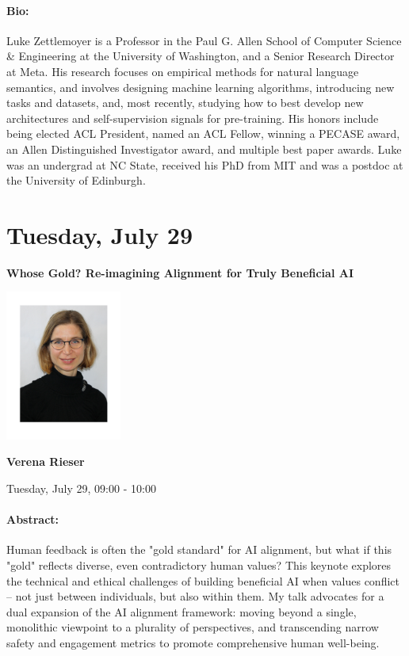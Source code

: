 \paragraph{Bio:}
Luke Zettlemoyer is a Professor in the Paul G. Allen School of Computer Science \& Engineering at the University of Washington, and a Senior Research Director at Meta. His research focuses on empirical methods for natural language semantics, and involves designing machine learning algorithms, introducing new tasks and datasets, and, most recently, studying how to best develop new architectures and self-supervision signals for pre-training. His honors include being elected ACL President, named an ACL Fellow, winning a PECASE award, an Allen Distinguished Investigator award, and multiple best paper awards. Luke was an undergrad at NC State, received his PhD from MIT and was a postdoc at the University of Edinburgh.


\clearpage


\section{Tuesday, July 29}
\vspace*{0.2cm}

\begin{center}
    {\Large \textbf{Whose Gold? Re-imagining Alignment for Truly Beneficial AI}}
    
    \includegraphics[width=1.5in]{examples/acl25-handbook/invited_talks/Verena.pdf}
    
    {\large \textbf{Verena Rieser}}

    Tuesday, July 29, 09:00 - 10:00
\end{center}

\paragraph{Abstract:}
Human feedback is often the "gold standard" for AI alignment, but what if this "gold" reflects diverse, even contradictory human values? This keynote explores the technical and ethical challenges of building beneficial AI when values conflict -- not just between individuals, but also within them. My talk advocates for a dual expansion of the AI alignment framework: moving beyond a single, monolithic viewpoint to a plurality of perspectives, and transcending narrow safety and engagement metrics to promote comprehensive human well-being. 

